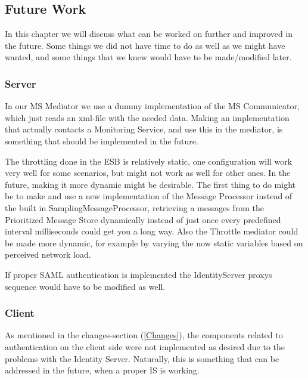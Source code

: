 \subsection{Future Work}\label{Future Work}
    In this chapter we will discuss what can be worked on further and improved in the future. Some things we did not have time to do as well as we might have wanted, and some things that we knew would have to be made/modified later.
    
    \subsubsection{Server}\label{Future:Server}
        In our MS Mediator we use a dummy implementation of the MS Communicator, which just reads an xml-file with the needed data. Making an implementation that actually contacts a Monitoring Service, and use this in the mediator, is something that should be implemented in the future.

        The throttling done in the ESB is relatively static, one configuration will work very well for some scenarios, but might not work as well for other ones. In the future, making it more dynamic might be desirable. The first thing to do might be to make and use a new implementation of the Message Processor instead of the built in SamplingMessageProcessor, retrieving a messages from the Prioritized Message Store dynamically instead of just once every predefined interval milliseconds could get you a long way. Also the Throttle mediator could be made more dynamic, for example by varying the now static variables based on perceived network load.

        If proper SAML authentication is implemented the IdentityServer proxys sequence would have to be modified as well.

\subsubsection{Client}\label{Future:Client}
As mentioned in the changes-section (\ref{Changes}), the components related to authentication on the client side were not implemented as desired due to the problems with the Identity Server. Naturally, this is something that can be addressed in the future, when a proper IS is working.

